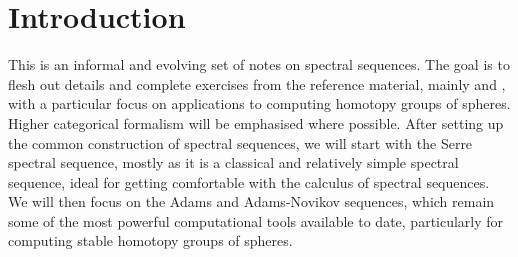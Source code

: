 \section{Introduction}
This is an informal and evolving set of notes on spectral sequences. The goal is to flesh out details and complete exercises from the reference material, mainly \cite{Hatcher-spec} and \cite{McCleary}, with a particular focus on applications to computing homotopy groups of spheres. Higher categorical formalism will be emphasised where possible. After setting up the common construction of spectral sequences, we will start with the Serre spectral sequence, mostly as it is a classical and relatively simple spectral sequence, ideal for getting comfortable with the calculus of spectral sequences. We will then focus on the Adams and Adams-Novikov sequences, which remain some of the most powerful computational tools available to date, particularly for computing stable homotopy groups of spheres.